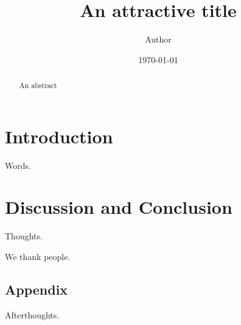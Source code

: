 \documentclass[preprintnumbers,amsmath,amssymb,prd, notitlepage,nofootinbib,twocolumn, superscriptaddress]{revtex4}
\newcommand{\bth}{\boldsymbol{\theta}}
\begin{document}
\title{An attractive title}

\author{Author}

\date{\today}

\begin{abstract}
  An abstract
\end{abstract}
\maketitle

\section{Introduction} \label{sec:Intro}


Words.





\section{Discussion and Conclusion}\label{sec:Conclusion}

Thoughts.

\acknowledgments

We thank people.



%


\begin{appendix}
\section{Appendix}

Afterthoughts.
\end{appendix}
\end{document}
